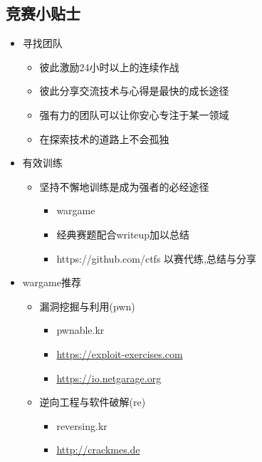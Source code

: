 \subsection{竞赛小贴士}
\indent \setlength{\parindent}{2em}
\begin{itemize}
    \item 寻找团队
    \begin{itemize}
        \item 彼此激励24小时以上的连续作战
        \item 彼此分享交流技术与心得是最快的成长途径
        \item 强有力的团队可以让你安心专注于某一领域
        \item 在探索技术的道路上不会孤独
    \end{itemize}
    
    \item 有效训练
    \begin{itemize}
        \item 坚持不懈地训练是成为强者的必经途径
        \begin{itemize}
            \item wargame
            \item 经典赛题配合writeup加以总结
            \item https://github.com/ctfs 以赛代练,总结与分享
        \end{itemize}
    \end{itemize}
    \item wargame推荐
    \begin{itemize}
        \item 漏洞挖掘与利用(pwn)
        \begin{itemize}
            \item pwnable.kr
            \item \href{https://exploit-exercises.com}{https://exploit-exercises.com}
            \item \href{https://io.netgarage.org}{https://io.netgarage.org}
        \end{itemize}
        
        \item 逆向工程与软件破解(re)
        \begin{itemize}
            \item reversing.kr
            \item \href{http://crackmes.de}{http://crackmes.de}
        \end{itemize}
        

\end{itemize}
\end{itemize}
